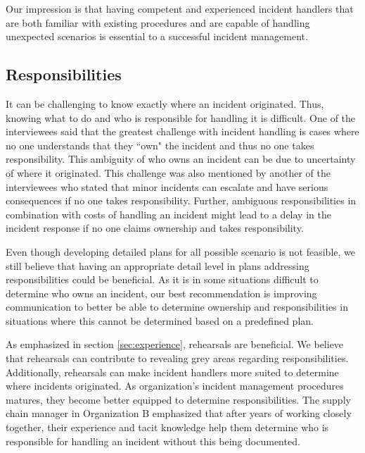 Our impression is that having competent and experienced incident handlers that are both familiar with existing procedures and are capable of handling unexpected scenarios is essential to a successful incident management.


\subsection{Responsibilities}
It can be challenging to know exactly where an incident originated. Thus, knowing what to do and who is responsible for handling it is difficult. One of the interviewees said that the greatest challenge with incident handling is cases where no one understands that they ``own" the incident and thus no one takes responsibility. This ambiguity of who owns an incident can be due to uncertainty of where it originated. This challenge was also mentioned by another of the interviewees who stated that minor incidents can escalate and have serious consequences if no one takes responsibility. Further, ambiguous responsibilities in combination with costs of handling an incident might lead to a delay in the incident response if no one claims ownership and takes responsibility. 

Even though developing detailed plans for all possible scenario is not feasible, we still believe that having an appropriate detail level in plans addressing responsibilities could be beneficial. As it is in some situations difficult to determine who owns an incident, our best recommendation is improving communication to better be able to determine ownership and responsibilities in situations where this cannot be determined based on a predefined plan.

As emphasized in section \ref{sec:experience}, rehearsals are beneficial. We believe that rehearsals can contribute to revealing grey areas regarding responsibilities. Additionally, rehearsals can make incident handlers more suited to determine where incidents originated. As organization's incident management procedures matures, they become better equipped to determine responsibilities. The supply chain manager in Organization B emphasized that after years of working closely together, their experience and tacit knowledge help them determine who is responsible for handling an incident without this being documented. 

